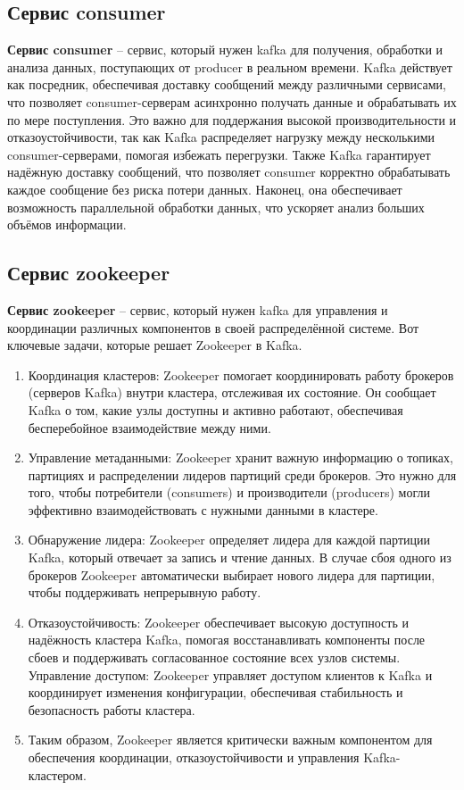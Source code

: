 \subsection{Сервис consumer}

\textbf{Сервис consumer} -- сервис, который нужен kafka для получения, обработки и анализа данных, поступающих от producer в реальном времени. Kafka действует как посредник, обеспечивая доставку сообщений между различными сервисами, что позволяет consumer-серверам асинхронно получать данные и обрабатывать их по мере поступления. Это важно для поддержания высокой производительности и отказоустойчивости, так как Kafka распределяет нагрузку между несколькими consumer-серверами, помогая избежать перегрузки. Также Kafka гарантирует надёжную доставку сообщений, что позволяет consumer корректно обрабатывать каждое сообщение без риска потери данных. Наконец, она обеспечивает возможность параллельной обработки данных, что ускоряет анализ больших объёмов информации.


\subsection{Сервис zookeeper}

\textbf{Сервис zookeeper} -- сервис, который нужен kafka для управления и координации различных компонентов в своей распределённой системе. Вот ключевые задачи, которые решает Zookeeper в Kafka.

\begin{enumerate}
  \item Координация кластеров: Zookeeper помогает координировать работу брокеров (серверов Kafka) внутри кластера, отслеживая их состояние. Он сообщает Kafka о том, какие узлы доступны и активно работают, обеспечивая бесперебойное взаимодействие между ними.
  \item Управление метаданными: Zookeeper хранит важную информацию о топиках, партициях и распределении лидеров партиций среди брокеров. Это нужно для того, чтобы потребители (consumers) и производители (producers) могли эффективно взаимодействовать с нужными данными в кластере.
  \item Обнаружение лидера: Zookeeper определяет лидера для каждой партиции Kafka, который отвечает за запись и чтение данных. В случае сбоя одного из брокеров Zookeeper автоматически выбирает нового лидера для партиции, чтобы поддерживать непрерывную работу.
  \item Отказоустойчивость: Zookeeper обеспечивает высокую доступность и надёжность кластера Kafka, помогая восстанавливать компоненты после сбоев и поддерживать согласованное состояние всех узлов системы.
  Управление доступом: Zookeeper управляет доступом клиентов к Kafka и координирует изменения конфигурации, обеспечивая стабильность и безопасность работы кластера.
  \item Таким образом, Zookeeper является критически важным компонентом для обеспечения координации, отказоустойчивости и управления Kafka-кластером.
\end{enumerate}


